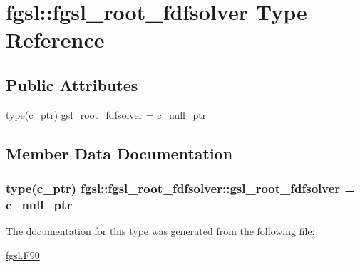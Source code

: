 \hypertarget{structfgsl_1_1fgsl__root__fdfsolver}{\section{fgsl\-:\-:fgsl\-\_\-root\-\_\-fdfsolver Type Reference}
\label{structfgsl_1_1fgsl__root__fdfsolver}
}
\subsection*{Public Attributes}
\begin{DoxyCompactItemize}
\item 
type(c\-\_\-ptr) \hyperlink{structfgsl_1_1fgsl__root__fdfsolver_a79a27ae4479bf3af32e15ac53e0ea567}{gsl\-\_\-root\-\_\-fdfsolver} = c\-\_\-null\-\_\-ptr
\end{DoxyCompactItemize}


\subsection{Member Data Documentation}
\hypertarget{structfgsl_1_1fgsl__root__fdfsolver_a79a27ae4479bf3af32e15ac53e0ea567}{
\subsubsection[{gsl\-\_\-root\-\_\-fdfsolver}]{\setlength{\rightskip}{0pt plus 5cm}type(c\-\_\-ptr) fgsl\-::fgsl\-\_\-root\-\_\-fdfsolver\-::gsl\-\_\-root\-\_\-fdfsolver = c\-\_\-null\-\_\-ptr}}\label{structfgsl_1_1fgsl__root__fdfsolver_a79a27ae4479bf3af32e15ac53e0ea567}


The documentation for this type was generated from the following file\-:\begin{DoxyCompactItemize}
\item 
\hyperlink{fgsl_8F90}{fgsl.\-F90}\end{DoxyCompactItemize}

